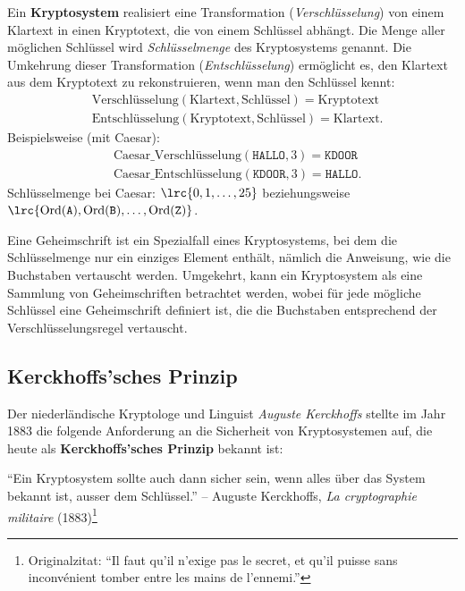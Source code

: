 \begin{mydefinition}[Kryptosystem]\label{mydefinition:kryptosystem}
	Ein \textbf{Kryptosystem} realisiert eine Transformation (\emph{Verschlüsselung}) von einem Klartext in einen Kryptotext, die von einem Schlüssel abhängt.
	Die Menge aller möglichen Schlüssel wird \emph{Schlüsselmenge} des Kryptosystems genannt.
	Die Umkehrung dieser Transformation (\emph{Entschlüsselung}) ermöglicht es, den Klartext aus dem Kryptotext zu rekonstruieren, wenn man den Schlüssel kennt:
	\begin{align*}
		 & \text{Verschlüsselung}(\text{Klartext}, \text{Schlüssel}) = \text{Kryptotext}  \\
		 & \text{Entschlüsselung}(\text{Kryptotext}, \text{Schlüssel}) = \text{Klartext}.
	\end{align*}
	Beispielsweise (mit Caesar):
	\begin{align*}
		 & \text{Caesar\_Verschlüsselung}(\texttt{HALLO}, 3) = \texttt{KDOOR}  \\
		 & \text{Caesar\_Entschlüsselung}(\texttt{KDOOR}, 3) = \texttt{HALLO}.
	\end{align*}
	Schlüsselmenge bei Caesar: $\lrc{0, 1, \dots, 25}$ beziehungsweise $\lrc{\text{Ord}(\texttt{A}), \text{Ord}(\texttt{B}), \dots, \text{Ord}(\texttt{Z})}$.
\end{mydefinition}

\begin{myremark}
	Eine Geheimschrift ist ein Spezialfall eines Kryptosystems, bei dem die Schlüsselmenge nur ein einziges Element enthält, nämlich die Anweisung, wie die Buchstaben vertauscht werden.
	Umgekehrt, kann ein Kryptosystem als eine Sammlung von Geheimschriften betrachtet werden, wobei für jede mögliche Schlüssel eine Geheimschrift definiert ist, die die Buchstaben entsprechend der Verschlüsselungsregel vertauscht.
\end{myremark}

\subsection{Kerckhoffs'sches Prinzip}
Der niederländische Kryptologe und Linguist \emph{Auguste Kerckhoffs} stellte im Jahr 1883 die folgende Anforderung an die Sicherheit von Kryptosystemen auf, die heute als \textbf{Kerckhoffs'sches Prinzip} bekannt ist:

\begin{myquote}\label{myquote:kerckhoffs}
	\enquote{Ein Kryptosystem sollte auch dann sicher sein, wenn alles über das System bekannt ist, ausser dem Schlüssel.} -- Auguste Kerckhoffs, \emph{La cryptographie militaire} (1883)\footnote{Originalzitat: \enquote{Il faut qu'il n'exige pas le secret, et qu'il puisse sans inconvénient tomber entre les mains de l'ennemi.}}
\end{myquote}

